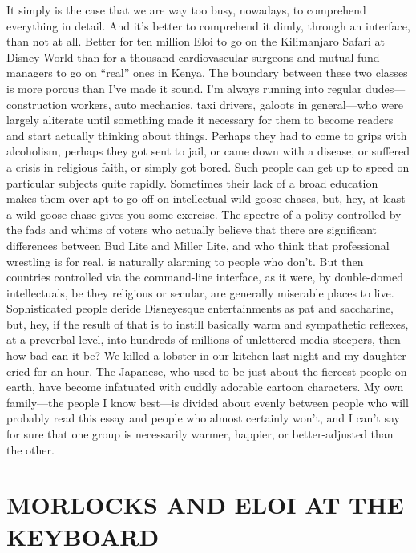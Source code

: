 \documentclass[
  fontsize=11pt,
  paper=landscape,
  twocolumn=true,
  pagesize=pdftex,
  headings=small,
  DIV=15,
  ]{scrartcl}
\begin{document}
It simply is the case that we are way too busy, nowadays, to comprehend
everything in detail. And it's better to comprehend it dimly, through an
interface, than not at all. Better for ten million Eloi to go on the
Kilimanjaro Safari at Disney World than for a thousand cardiovascular
surgeons and mutual fund managers to go on ``real'' ones in Kenya. The
boundary between these two classes is more porous than I've made it
sound. I'm always running into regular dudes---construction workers,
auto mechanics, taxi drivers, galoots in general---who were largely
aliterate until something made it necessary for them to become readers
and start actually thinking about things. Perhaps they had to come to
grips with alcoholism, perhaps they got sent to jail, or came down with
a disease, or suffered a crisis in religious faith, or simply got bored.
Such people can get up to speed on particular subjects quite rapidly.
Sometimes their lack of a broad education makes them over-apt to go off
on intellectual wild goose chases, but, hey, at least a wild goose chase
gives you some exercise. The spectre of a polity controlled by the fads
and whims of voters who actually believe that there are significant
differences between Bud Lite and Miller Lite, and who think that
professional wrestling is for real, is naturally alarming to people who
don't. But then countries controlled via the command-line interface, as
it were, by double-domed intellectuals, be they religious or secular,
are generally miserable places to live. Sophisticated people deride
Disneyesque entertainments as pat and saccharine, but, hey, if the
result of that is to instill basically warm and sympathetic reflexes, at
a preverbal level, into hundreds of millions of unlettered
media-steepers, then how bad can it be? We killed a lobster in our
kitchen last night and my daughter cried for an hour. The Japanese, who
used to be just about the fiercest people on earth, have become
infatuated with cuddly adorable cartoon characters. My own family---the
people I know best---is divided about evenly between people who will
probably read this essay and people who almost certainly won't, and I
can't say for sure that one group is necessarily warmer, happier, or
better-adjusted than the other.

\section{MORLOCKS AND ELOI AT THE KEYBOARD}
\end{document}
